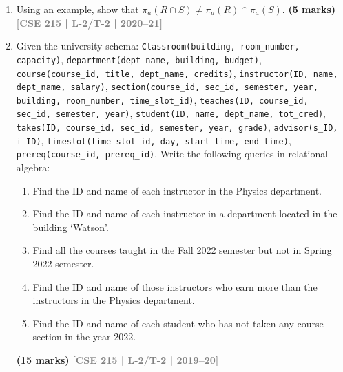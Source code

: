 \documentclass[12pt,a3paper]{article}
\newcommand{\yr}[1]{\hfill\textcolor{gray}{\small\textbf{[#1]}}}
\newcommand{\mk}[1]{\textcolor{orange!70!black}{\small\textbf{(#1 marks)}}}
\begin{document}
\begin{enumerate}
\item Using an example, show that $\pi_a(R \cap S) \neq \pi_a(R) \cap \pi_a(S)$.
\mk{5} \yr{CSE 215 | L-2/T-2 | 2020--21}

\item Given the university schema: \texttt{Classroom(building, room\_number, capacity)}, \texttt{department(dept\_name, building, budget)}, \texttt{course(course\_id, title, dept\_name, credits)}, \texttt{instructor(ID, name, dept\_name, salary)}, \texttt{section(course\_id, sec\_id, semester, year, building, room\_number, time\_slot\_id)}, \texttt{teaches(ID, course\_id, sec\_id, semester, year)}, \texttt{student(ID, name, dept\_name, tot\_cred)}, \texttt{takes(ID, course\_id, sec\_id, semester, year, grade)}, \texttt{advisor(s\_ID, i\_ID)}, \texttt{timeslot(time\_slot\_id, day, start\_time, end\_time)}, \texttt{prereq(course\_id, prereq\_id)}. Write the following queries in relational algebra:
\begin{enumerate}
  \item Find the ID and name of each instructor in the Physics department.
  \item Find the ID and name of each instructor in a department located in the building `Watson'.
  \item Find all the courses taught in the Fall 2022 semester but not in Spring 2022 semester.
  \item Find the ID and name of those instructors who earn more than the instructors in the Physics department.
  \item Find the ID and name of each student who has not taken any course section in the year 2022.
\end{enumerate}
\mk{15} \yr{CSE 215 | L-2/T-2 | 2019--20}


\end{enumerate}
\end{document}
